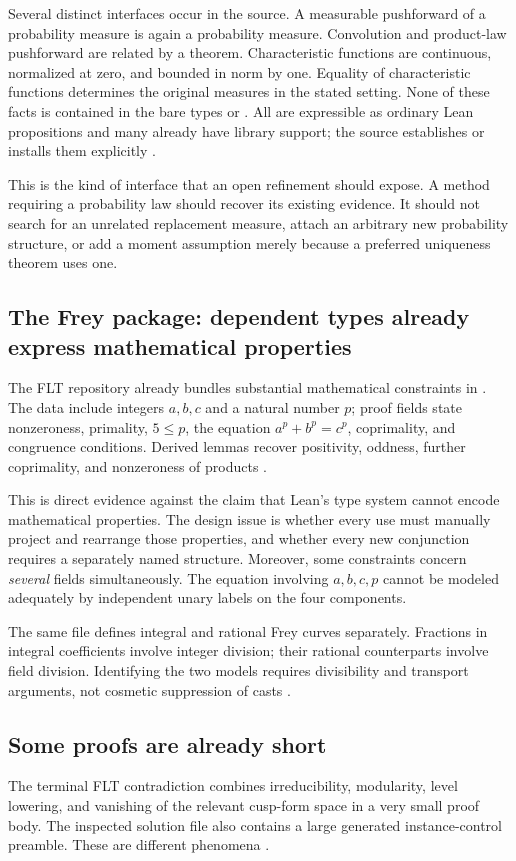 \documentclass[11pt,a4paper]{article}
\newcommand{\code}[1]{\texttt{\detokenize{#1}}}
\theoremstyle{definition}
\begin{document}
Several distinct interfaces occur in the source. A measurable pushforward of a
probability measure is again a probability measure. Convolution and product-law
pushforward are related by a theorem. Characteristic functions are continuous,
normalized at zero, and bounded in norm by one. Equality of characteristic
functions determines the original measures in the stated setting. None of these
facts is contained in the bare types \code{Measure E} or \code{E -> Complex}.
All are expressible as ordinary Lean propositions and many already have library
support; the source establishes or installs them explicitly \cite{affine}.

This is the kind of interface that an open refinement should expose. A method
requiring a probability law should recover its existing evidence. It should
not search for an unrelated replacement measure, attach an arbitrary new
probability structure, or add a moment assumption merely because a preferred
uniqueness theorem uses one.

\subsection{The Frey package: dependent types already express mathematical properties}
The FLT repository already bundles substantial mathematical constraints in
\code{FreyPackage}. The data include integers $a,b,c$ and a natural number $p$;
proof fields state nonzeroness, primality, $5\le p$, the equation
$a^p+b^p=c^p$, coprimality, and congruence conditions. Derived lemmas recover
positivity, oddness, further coprimality, and nonzeroness of products
\cite{frey}.

This is direct evidence against the claim that Lean's type system cannot encode
mathematical properties. The design issue is whether every use must manually
project and rearrange those properties, and whether every new conjunction
requires a separately named structure. Moreover, some constraints concern
\emph{several} fields simultaneously. The equation involving $a,b,c,p$ cannot
be modeled adequately by independent unary labels on the four components.

The same file defines integral and rational Frey curves separately. Fractions
in integral coefficients involve integer division; their rational counterparts
involve field division. Identifying the two models requires divisibility and
transport arguments, not cosmetic suppression of casts \cite{frey}.

\subsection{Some proofs are already short}
The terminal FLT contradiction combines irreducibility, modularity, level
lowering, and vanishing of the relevant cusp-form space in a very small proof
body. The inspected solution file also contains a large generated
instance-control preamble. These are different phenomena \cite{fltend}.
\end{document}
